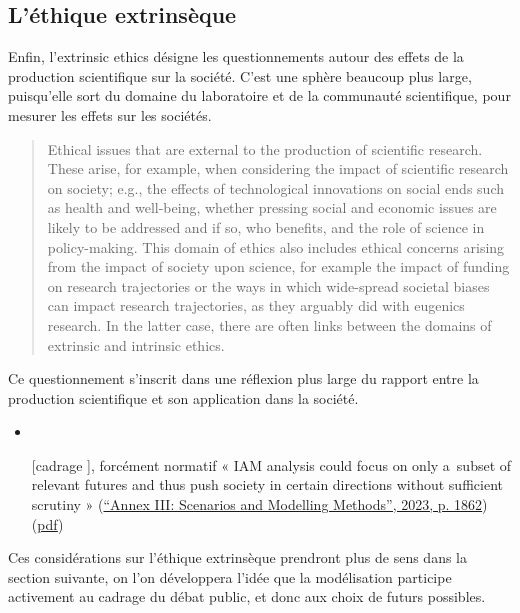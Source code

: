 \subsection{L'éthique extrinsèque}

Enfin, l'\Gls{extrinsic ethics} désigne les questionnements autour des effets de la production scientifique sur la société. C'est une sphère beaucoup plus large, puisqu'elle sort du domaine du laboratoire et de la communauté scientifique, pour mesurer les effets sur les sociétés. 

\begin{quote}
Ethical issues that are external to the production of scientific research. These arise, for example, when considering the impact of scientific research on society; e.g., the effects of technological innovations on social ends such as health and well-being, whether pressing social and economic issues are likely to be addressed and if so, who benefits, and the role of science in policy-making. This domain of ethics also includes ethical concerns arising from the impact of society upon science, for example the impact of funding on research trajectories or the ways in which wide-spread societal biases can impact research trajectories, as they arguably did with eugenics research. In the latter case, there are often links between the domains of extrinsic and intrinsic ethics.
\end{quote}
Ce questionnement s'inscrit dans une réflexion plus large du rapport entre la production scientifique et son application dans la société. 

\begin{tcolorbox}
\begin{itemize}
    \item 
    \item [[cadrage]], forcément normatif « IAM analysis could focus on only a subset of relevant futures and thus push society in certain directions without sufficient scrutiny » (\href{zotero://select/library/items/2SDDNUUF}{“Annex III: Scenarios and Modelling Methods”, 2023, p. 1862}) (\href{zotero://open-pdf/library/items/CHVFSLLH?page=22&annotation=4MBM5B9Q}{pdf})

\end{itemize}

\end{tcolorbox}


 Ces considérations sur l'éthique extrinsèque prendront plus de sens dans la section suivante, on l'on développera l'idée que la modélisation participe activement au cadrage du débat public, et donc aux choix de futurs possibles. 

